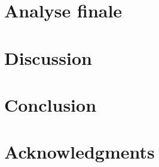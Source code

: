 \documentclass[a4paper,12pt]{article}
\begin{document}
\section{Analyse finale}

\section{Discussion}

\section{Conclusion}

\section*{Acknowledgments}

\begin{thebibliography}{9}
\end{thebibliography}
\end{document}
